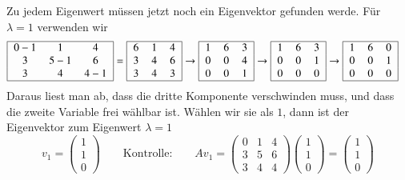 Zu jedem Eigenwert müssen jetzt noch ein Eigenvektor gefunden werde.
Für $\lambda=1$ verwenden wir 
\begin{align*}
\begin{tabular}{|>{$}c<{$}>{$}c<{$}>{$}c<{$}|}
\hline
0-1&1&4\\
3&5-1&6\\
3&4&4-1\\
\hline
\end{tabular}
&=
\begin{tabular}{|>{$}c<{$}>{$}c<{$}>{$}c<{$}|}
\hline
6&1&4\\
3&4&6\\
3&4&3\\
\hline
\end{tabular}
\rightarrow
\begin{tabular}{|>{$}c<{$}>{$}c<{$}>{$}c<{$}|}
\hline
1&6&3\\
0&0&4\\
0&0&1\\
\hline
\end{tabular}
\rightarrow
\begin{tabular}{|>{$}c<{$}>{$}c<{$}>{$}c<{$}|}
\hline
1&6&3\\
0&0&1\\
0&0&0\\
\hline
\end{tabular}
\rightarrow
\begin{tabular}{|>{$}c<{$}>{$}c<{$}>{$}c<{$}|}
\hline
1&6&0\\
0&0&1\\
0&0&0\\
\hline
\end{tabular}
\end{align*}
Daraus liest man ab, dass die dritte Komponente verschwinden muss, und dass
die zweite Variable frei wählbar ist.
Wählen wir sie als $1$, dann ist der Eigenvektor zum Eigenwert $\lambda=1$
\[
v_1
=
\begin{pmatrix}1\\1\\0\end{pmatrix}
\qquad\text{Kontrolle:}\qquad
Av_1
=
\begin{pmatrix}
0&1&4\\
3&5&6\\
3&4&4
\end{pmatrix}
\begin{pmatrix}1\\1\\0\end{pmatrix}
=
\begin{pmatrix}1\\1\\0\end{pmatrix}
\]

